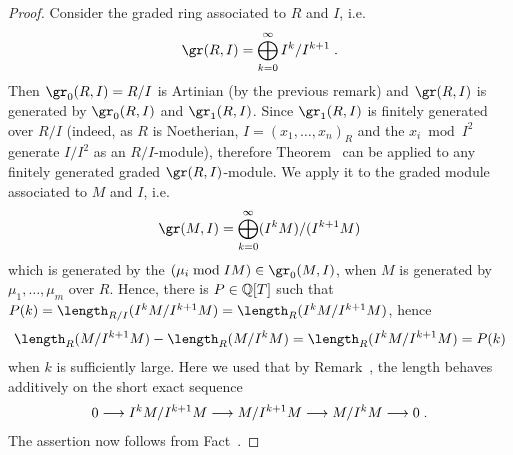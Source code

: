 \documentclass[a4paper,parskip=half,numbers=enddot, DIV=12, headheight=30pt]{scrreprt}
\begin{document}
\begin{proof}
    Consider the graded ring associated to $R$ and $I$, i.e.
    \begin{align*}
    	\gr(R,I) = \bigoplus_{k=0}^\infty I^k/I^{k+1}\;. 
    \end{align*}
    Then $\gr_0(R,I) = R/I$ is Artinian (by the previous remark) and $\gr(R,I)$ is generated by $\gr_0(R,I)$ and $\gr_1(R,I)$. Since $\gr_1(R,I)$ is finitely generated over $R/I$ (indeed, as $R$ is Noetherian, $I =  (x_1,\ldots, x_n)_R$ and the $x_i\bmod I^2$ generate $I/I^2$ as an $R/I$-module), therefore Theorem~ can be applied to any finitely generated graded $\gr(R,I)$-module. We apply it to the graded module associated to $M$ and $I$, i.e.
    \begin{align*}
    	\gr(M,I) = \bigoplus_{k=0}^\infty (I^kM)/(I^{k+1}M)
    \end{align*}	
   	which is generated by the $(\mu_i \bmod IM)\in \gr_0(M,I)$, when $M$ is generated by $\mu_1,\ldots,\mu_m$ over $R$. Hence, there is $P\in \mathbb{Q}[T]$ such that $P(k) = \length_{R/I} (I^kM/I^{k+1}M) = \length_R(I^kM/I^{k+1}M)$, hence
    \begin{align*}
        \length_R(M/I^{k+1}M) - \length_R(M/I^kM) = \length_R(I^kM/I^{k+1}M) = P(k)
    \end{align*}
    when $k$ is sufficiently large. Here we used that by Remark~, the length behaves additively on the short exact sequence
    \begin{align*}
    	0\morphism I^kM/I^{k+1} M \morphism M/I^{k+1}M \morphism M/I^kM\morphism 0\;.
    \end{align*}
    The assertion now follows from Fact~.
\end{proof}
\end{document}
